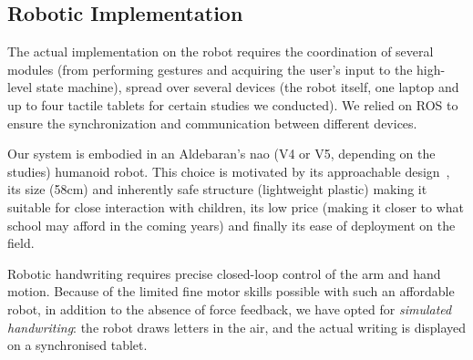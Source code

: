 \documentclass[conference]{IEEEtran}
\begin{document}
\subsection{Robotic Implementation}

The actual implementation on the robot requires the coordination of
several modules (from performing gestures and acquiring the user's input to
the high-level state machine), spread over several devices (the robot itself,
one laptop and up to four tactile tablets for certain studies we conducted). We
relied on ROS to ensure the synchronization and communication between different devices.

Our system is embodied in an Aldebaran's {\sc nao} (V4 or V5, depending on the
studies) humanoid robot. This choice is motivated by its approachable
design~\cite{Gouaillier2008}, its size (58cm) and inherently safe structure
(lightweight plastic) making it suitable for close interaction with children,
its low price (making it closer to what school may afford in the coming years)
and finally its ease of deployment on the field.

Robotic handwriting requires precise closed-loop control of the arm and hand
motion. Because of the limited fine motor skills possible with such an
affordable robot, in addition to the absence of force feedback, we have opted
for \emph{simulated handwriting}: the robot draws letters in the air, and the
actual writing is displayed on a synchronised tablet.
\end{document}
